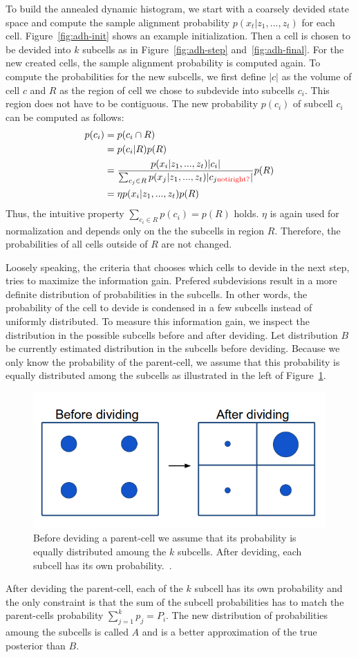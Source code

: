 \documentclass[twoside,a4paper,article]{combine}
\begin{document}
To build the annealed dynamic histogram, we start with a coarsely
devided state space and compute the sample alignment probability
$p(x_t|z_1,...,z_t)$ for each cell. Figure~\ref{fig:adh-init} shows an
example initialization. Then a cell is chosen to be devided into $k$
subcells as in Figure~\ref{fig:adh-step} and~\ref{fig:adh-final}. For
the new created cells, the sample alignment probability is computed
again. To compute the probabilities for the new subcells, we first
define $|c|$ as the volume of cell $c$ and $R$ as the region of cell
we chose to subdevide into subcells $c_i$. This region does not have
to be contiguous. The new probability $p(c_i)$ of subcell $c_i$ can be
computed as follows:
\begin{align}
p(c_i)
&=p(c_i\cap R)\nonumber\\
&=p(c_i|R)p(R)\nonumber\\
&=\frac{p(x_i|z_1,...,z_t)|c_i|}{\sum_{c_j\in
    R}p(x_j|z_1,...,z_t)|c_{j\mathrm{ \textcolor{red}{ not i right?}}}|}p(R)\nonumber\\
&=\eta p(x_i|z_1,...,z_t)p(R)
\end{align}
Thus, the intuitive property $\sum_{c_i\in R}p(c_i)=p(R)$
holds. $\eta$ is again used for normalization and depends only on the
the subcells in region $R$. Therefore, the probabilities of all cells
outside of $R$ are not changed.

Loosely speaking, the criteria that chooses which cells to devide in
the next step, tries to maximize the information gain. Prefered
subdevisions result in a more definite distribution of probabilities
in the subcells. In other words, the probability of the cell to devide
is condensed in a few subcells instead of uniformly distributed. 
To measure this information gain, we inspect the distribution in the
possible subcells before and after deviding. Let distribution $B$ be
currently estimated distribution in the subcells before
deviding. Because we only know the probability of the parent-cell, we
assume that this probability is equally distributed among the subcells
as illustrated in the left of Figure~\ref{fig:adh-criteria}.
\begin{figure}
  \center
  \includegraphics[width=0.55\linewidth]{devision-criteria}
  \caption{Before deviding a parent-cell we assume that its
    probability is equally distributed amoung the $k$ subcells. After
    deviding, each subcell has its own probability.~\cite{paper}.}
  \label{fig:adh-criteria}
\end{figure}
After deviding the parent-cell, each of the $k$ subcell has its own
probability and the only constraint is that the sum of the subcell
probabilities has to match the parent-cells probability $\sum_{j=1}^k p_j=P_i$. The new
distribution of probabilities amoung the subcells is called $A$ and is
a better approximation of the true posterior than $B$.
\end{document}

